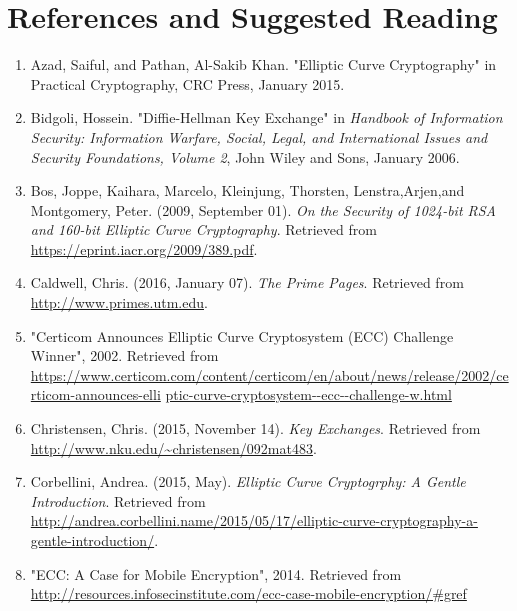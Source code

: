 \section{References and Suggested Reading} 
\begin{enumerate}[(1)]

\item\label{Azad}
Azad, Saiful, and Pathan, Al-Sakib Khan. "Elliptic Curve Cryptography" in Practical Cryptography, CRC Press, January 2015.

\item \label{Bidgoli}
Bidgoli, Hossein. "Diffie-Hellman Key Exchange" in \emph{Handbook of Information
Security: Information Warfare, Social, Legal, and International Issues and
Security Foundations, Volume 2}, John Wiley and Sons, January 2006.

\item \label{Bos}
Bos, Joppe, Kaihara, Marcelo, Kleinjung, Thorsten, Lenstra,Arjen,and Montgomery, Peter. (2009, September 01). \emph{On the Security of 1024-bit RSA and 160-bit Elliptic Curve Cryptography}. Retrieved from \url{https://eprint.iacr.org/2009/389.pdf}.

\item \label{Caldwell}
Caldwell, Chris. (2016, January 07). \emph{The Prime Pages}. Retrieved from \url{http://www.primes.utm.edu}.

\item \label{Certicom}
"Certicom Announces Elliptic Curve Cryptosystem (ECC) Challenge Winner",  2002. Retrieved from \url{https://www.certicom.com/content/certicom/en/about/news/release/2002/certicom-announces-elli} \newline \url{ptic-curve-cryptosystem--ecc--challenge-w.html}

\item \label{Christensen}
Christensen, Chris. (2015, November 14). \emph{Key Exchanges}. Retrieved from \url{http://www.nku.edu/~christensen/092mat483}.

\item \label{Corbellini}
Corbellini, Andrea. (2015, May). \emph{Elliptic Curve Cryptogrphy: A Gentle Introduction}. Retrieved from \url{http://andrea.corbellini.name/2015/05/17/elliptic-curve-cryptography-a-gentle-introduction/}.

\item \label{mobile}
"ECC: A Case for Mobile Encryption", 2014. Retrieved from \url{http://resources.infosecinstitute.com/ecc-case-mobile-encryption/#gref}


\end{enumerate}
